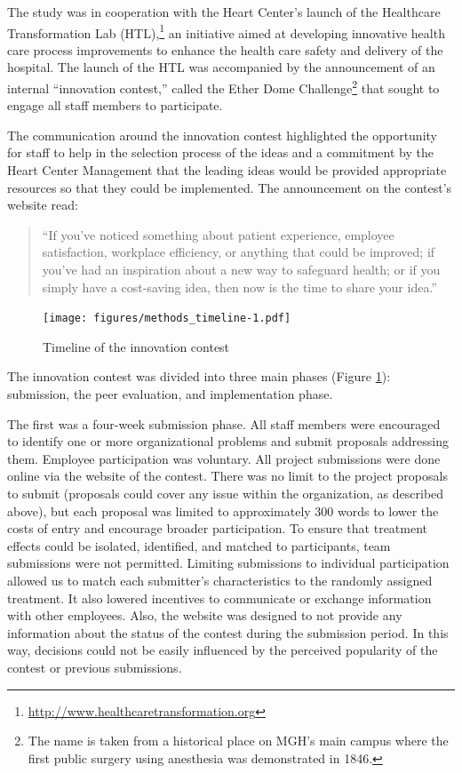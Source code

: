 \documentclass[12pt, titlepage]{article}
\begin{document}
The study was in cooperation with the Heart Center's launch of the
Healthcare Transformation Lab (HTL),\footnote{\url{http://www.healthcaretransformation.org}}
an initiative aimed at developing innovative health care process
improvements to enhance the health care safety and delivery of the
hospital. The launch of the HTL was accompanied by the announcement of
an internal ``innovation contest,'' called the Ether Dome
Challenge\footnote{The name is taken from a historical place on MGH's
  main campus where the first public surgery using anesthesia was
  demonstrated in 1846.} that sought to engage all staff members to
participate.

The communication around the innovation contest highlighted the
opportunity for staff to help in the selection process of the ideas and
a commitment by the Heart Center Management that the leading ideas would
be provided appropriate resources so that they could be implemented. The
announcement on the contest's website read:

\begin{quote}
``If you've noticed something about patient experience, employee
satisfaction, workplace efficiency, or anything that could be improved;
if you've had an inspiration about a new way to safeguard health; or if
you simply have a cost-saving idea, then now is the time to share your
idea.''
\end{quote}

\begin{figure}
\centering
\caption{Timeline of the innovation contest}
\label{timeline}
\texttt{[image: figures/methods\_timeline-1.pdf]}
\end{figure}

The innovation contest was divided into three main phases (Figure
\ref{timeline}): submission, the peer evaluation, and implementation
phase.

The first was a four-week submission phase. All staff members were
encouraged to identify one or more organizational problems and submit
proposals addressing them. Employee participation was voluntary. All
project submissions were done online via the website of the contest.
There was no limit to the project proposals to submit (proposals could
cover any issue within the organization, as described above), but each
proposal was limited to approximately 300 words to lower the costs of
entry and encourage broader participation. To ensure that treatment
effects could be isolated, identified, and matched to participants, team
submissions were not permitted. Limiting submissions to individual
participation allowed us to match each submitter's characteristics to
the randomly assigned treatment. It also lowered incentives to
communicate or exchange information with other employees. Also, the
website was designed to not provide any information about the status of
the contest during the submission period. In this way, decisions could
not be easily influenced by the perceived popularity of the contest or
previous submissions.
\end{document}
